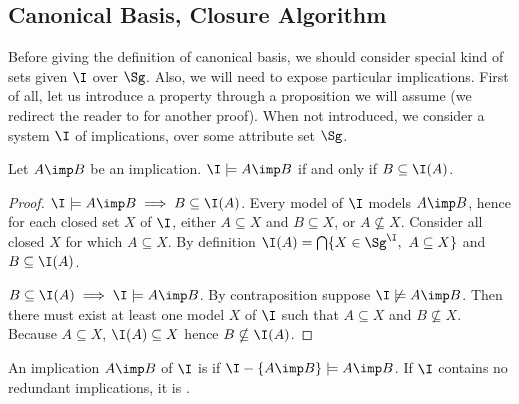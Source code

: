 
\subsection{Canonical Basis, Closure Algorithm}

Before giving the definition of canonical basis, we should consider special 
kind of sets given $\I$ over $\Sg$. Also, we will need to expose particular
implications. First of all, let us introduce a property through a proposition
we will assume (we redirect the reader to \cite{b._ganter_conceptual_2016}
for another proof). When not introduced, we consider a system $\I$
of implications, over some attribute set $\Sg$.

\begin{proposition} Let $A \imp B$ be an implication. $\I \models A \imp B$
	if and only if $B \subseteq \I(A)$.	
\end{proposition}

\begin{proof} $\I \models A \imp B \implies B \subseteq \I(A)$. Every model
of $\I$ models $A \imp B$, hence for each closed set $X$ of $\I$, either 
$A \subseteq X $ and $B \subseteq X$, or $A \nsubseteq X$. Consider all closed 
$X$ for which $A \subseteq X$. By definition $\I(A) = \bigcap \{X \in 
\Sg^{\I},\  A \subseteq X \}$ and $B \subseteq \I(A)$.

\vspace{1.2em}

$B \subseteq \I(A) \implies \I \models A \imp B$. By contraposition suppose 
$\I \not\models A \imp B$. Then there must exist at least one model $X$ of $\I$
such that $A \subseteq X$ and $B \nsubseteq X$. Because $A \subseteq X$, 
$\I(A) \subseteq X$ hence $B \nsubseteq \I(A)$.
	
\end{proof}

\begin{definition} An implication $A \imp B$ of $\I$ is 
 if $\I - \{A \imp B \} \models A \imp B$. If $\I$ 
contains no redundant implications, it is .
	
\end{definition}

